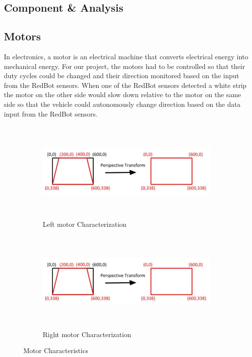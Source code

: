 \documentclass[12pt,a4paper]{article}
\begin{document}
\begin{large}
\section{Component & Analysis}


\subsection{Motors}

In electronics, a motor is an electrical machine that converts electrical energy into mechanical energy. For our project, the motors had to be controlled so that their duty cycles could be changed and their direction monitored based on the input from the RedBot sensors. When one of the RedBot sensors detected a white strip the motor on the other side would slow down relative to the motor on the same side so that the vehicle could autonomously change direction based on the data input from the RedBot sensors. 

\begin{figure} [hbp]
\centering
  \begin{subfigure}[b]{0.4\textwidth}
    \includegraphics[width=\textwidth, height = 5cm]{images/perspective_transform.jpg}
    \caption{Left motor Characterization}
    \label{fig:f1}
  \end{subfigure}
  \hspace{1cm}
  \begin{subfigure}[b]{0.4\textwidth}
    \includegraphics[width=\textwidth, height = 5cm]{images/perspective_transform.jpg}
    \caption{Right motor Characterization}
    \label{fig:f2}
  \end{subfigure}
  \caption{Motor Characteristics}
\end{figure}


\end{large}
\end{document}
